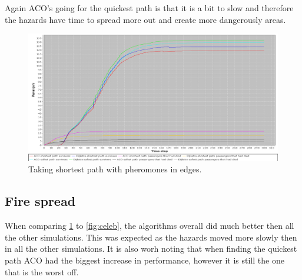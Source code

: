 Again ACO's going for the quickest path is that it is a bit to slow and therefore the hazards have time to spread more out and create more dangerously areas.

\begin{figure} [h]
\centering
\hspace*{-1.0in}
\includegraphics[scale=0.35]{images/Graph-using-200-rounds-140-passangers-slow-fire.png}
\caption{Taking shortest path with pheromones in edges.}
\label{fig:celebSfire}
\end{figure}

\subsection{Fire spread}

When comparing \ref{fig:celebSfire} to \ref{fig:celeb}, the algorithms overall did much better then all the other simulations. This was expected as the hazards moved more slowly then in all the other simulations. It is also worh noting that when finding the quickest path ACO had the biggest increase in performance, however it is still the one that is the worst off.


